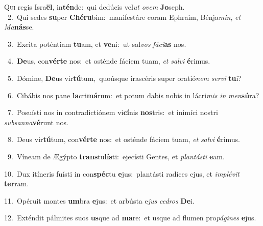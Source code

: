 \lettrine{\initial\textcolor{\initialcolor}{Q}}{ui} regis Isra\-\textbf{ël}\-, in\-\textbf{tén}\-de:~\star qui dedúcis vel\textit{ut} \textit{o}\-\textit{vem} \textbf{Jo}\-seph.\\
{\numbfont\textcolor{\numbcolor}{~2.}}~Qui sedes \textbf{su}\-per \textbf{Ché}\-\textbf{ru}bim:~\star manifestáre coram Ephraim, Bénja\-\textit{min}\-, \textit{et} \textit{Ma}\-\textbf{nás}se.\par
{\numbfont\textcolor{\numbcolor}{~3.}}~Excita poténtiam \textbf{tu}\-am, et \textbf{ve}\-ni:~\star ut sal\textit{vos} \textit{fá}\-\textit{ci}\textbf{as} nos.\par
{\numbfont\textcolor{\numbcolor}{~4.}}~\-\textbf{De}\-us, con\-\textbf{vér}\-\textbf{te} nos:~\star et osténde fáciem tuam, \textit{et} \textit{sal}\-\textit{vi} \textbf{é}\-rimus.\par
{\numbfont\textcolor{\numbcolor}{~5.}}~Dómine, \textbf{De}\-us vir\-\textbf{tú}\-tum,~\star quoúsque irascéris super oratió\textit{nem} \textit{ser}\-\textit{vi} \textbf{tu}\-i?\par
{\numbfont\textcolor{\numbcolor}{~6.}}~Cibábis nos pane \textbf{la}\-cri\-\textbf{má}\-rum:~\star et potum dabis nobis in lácri\textit{mis} \textit{in} \textit{men}\-\textbf{sú}ra?\par
{\numbfont\textcolor{\numbcolor}{~7.}}~Posuísti nos in contradictiónem vi\-\textbf{cí}\-nis \textbf{nos}\-tris:~\star et inimíci nostri \textit{sub}\-\textit{san}\textit{na}\textbf{vé}runt nos.\par
{\numbfont\textcolor{\numbcolor}{~8.}}~Deus vir\-\textbf{tú}\-tum, con\-\textbf{vér}\-\textbf{te} nos:~\star et osténde fáciem tuam, \textit{et} \textit{sal}\-\textit{vi} \textbf{é}\-rimus.\par
{\numbfont\textcolor{\numbcolor}{~9.}}~Víneam de Ægýpto \textbf{trans}\-tu\-\textbf{lís}\-ti:~\star ejecísti Gentes, et \textit{plan}\-\textit{tás}\textit{ti} \textbf{e}\-am.\par
{\numbfont\textcolor{\numbcolor}{10.}}~Dux itíneris fuísti in con\-\textbf{spéc}\-tu \textbf{e}\-jus:~\star plantásti radíces ejus, et \textit{im}\-\textit{plé}\textit{vit} \textbf{ter}\-ram.\par
{\numbfont\textcolor{\numbcolor}{11.}}~Opéruit montes \textbf{um}\-bra \textbf{e}\-jus:~\star et arbústa e\textit{jus} \textit{ce}\-\textit{dros} \textbf{De}\-i.\par
{\numbfont\textcolor{\numbcolor}{12.}}~Exténdit pálmites suos \textbf{us}\-que ad \textbf{ma}\-re:~\star et usque ad flumen pro\-\textit{pá}\-\textit{gi}\textit{nes} \textbf{e}\-jus.\par
